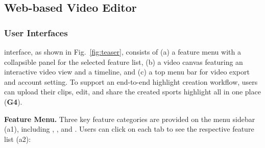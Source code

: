 



\subsection{Web-based Video Editor}

\subsubsection{User Interfaces}
\SB{} interface, as shown in Fig.~\ref{fig:teaser}, consists of 
(a) a feature menu with a collapsible panel for the selected feature list, 
(b) a video canvas featuring an interactive video view and a timeline, and 
(c) a top menu bar for video export and account setting. 
To support an end-to-end highlight creation workflow, users can upload their clips, edit, and share the created sports highlight all in one place (\textbf{G4}). 

\vspace{1mm}
\noindent\textbf{Feature Menu.}
Three key feature categories are provided on the menu sidebar (a1), including \Media{}, \Highlight{}, and \Narrative{}. Users can click on each tab to see the respective feature list (a2):

